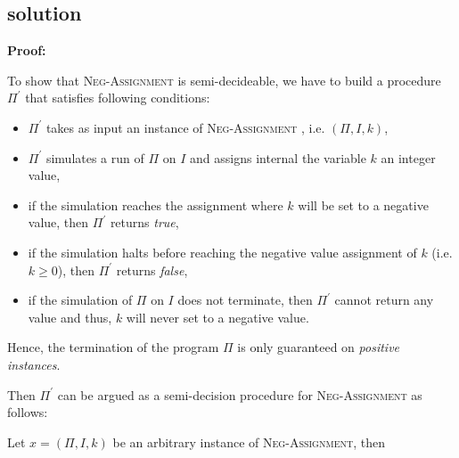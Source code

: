 \subsection{solution}
\textbf{Proof:}

To show that \textsc{Neg-Assignment} is semi-decideable, we have to build a
procedure $\Pi ^{\prime }$ that satisfies following conditions:

\begin{itemize}
\item $\Pi ^{\prime }$ takes as input an instance of \textsc{Neg-Assignment}%
, i.e. $\left( \Pi ,I,k\right) $,

\item $\Pi ^{\prime }$ simulates a run of $\Pi $ on $I$ and assigns internal
the variable $k$ an integer value,

\item if the simulation reaches the assignment where $k$ will be set to a
negative value, then $\Pi ^{\prime }$ returns \textit{true},

\item if the simulation halts before reaching the negative value assignment
of $k$ (i.e. $k\geq 0$), then $\Pi ^{\prime }$ returns \textit{false},

\item if the simulation of $\Pi $ on $I$ does not terminate, then $\Pi
^{\prime }$ cannot return any value and thus, $k$ will never set to a
negative value.
\end{itemize}

\bigskip Hence, the termination of the program $\Pi $ is only guaranteed on 
\textit{positive instances}.

Then $\Pi ^{\prime }$ can be argued as a semi-decision procedure for \textsc{%
Neg-Assignment} as follows:

Let $x=\left( \Pi ,I,k\right) $ be an arbitrary instance of \textsc{%
Neg-Assignment}, then

